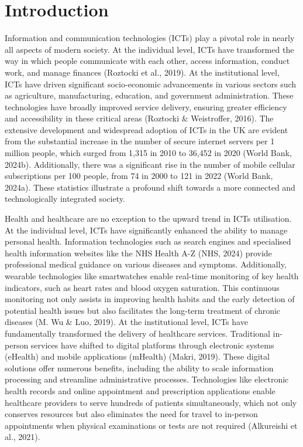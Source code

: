 \chapter{\label{ch:1-intro}Introduction} 

Information and communication technologies (ICTs) play a pivotal role in nearly all aspects of modern society. At the individual level, ICTs have transformed the way in which people communicate with each other, access information, conduct work, and manage finances (Roztocki et al., 2019). At the institutional level, ICTs have driven significant socio-economic advancements in various sectors such as agriculture, manufacturing, education, and government administration. These technologies have broadly improved service delivery, ensuring greater efficiency and accessibility in these critical areas (Roztocki \& Weistroffer, 2016). The extensive development and widespread adoption of ICTs in the UK are evident from the substantial increase in the number of secure internet servers per 1 million people, which surged from 1,315 in 2010 to 36,452 in 2020 (World Bank, 2024b). Additionally, there was a significant rise in the number of mobile cellular subscriptions per 100 people, from 74 in 2000 to 121 in 2022 (World Bank, 2024a). These statistics illustrate a profound shift towards a more connected and technologically integrated society.

Health and healthcare are no exception to the upward trend in ICTs utilisation. At the individual level, ICTs have significantly enhanced the ability to manage personal health. Information technologies such as search engines and specialised health information websites like the NHS Health A-Z (NHS, 2024) provide professional medical guidance on various diseases and symptoms. Additionally, wearable technologies like smartwatches enable real-time monitoring of key health indicators, such as heart rates and blood oxygen saturation. This continuous monitoring not only assists in improving health habits and the early detection of potential health issues but also facilitates the long-term treatment of chronic diseases (M. Wu \& Luo, 2019). At the institutional level, ICTs have fundamentally transformed the delivery of healthcare services. Traditional in-person services have shifted to digital platforms through electronic systems (eHealth) and mobile applications (mHealth) (Makri, 2019). These digital solutions offer numerous benefits, including the ability to scale information processing and streamline administrative processes. Technologies like electronic health records and online appointment and prescription applications enable healthcare providers to serve hundreds of patients simultaneously, which not only conserves resources but also eliminates the need for travel to in-person appointments when physical examinations or tests are not required (Alkureishi et al., 2021).

